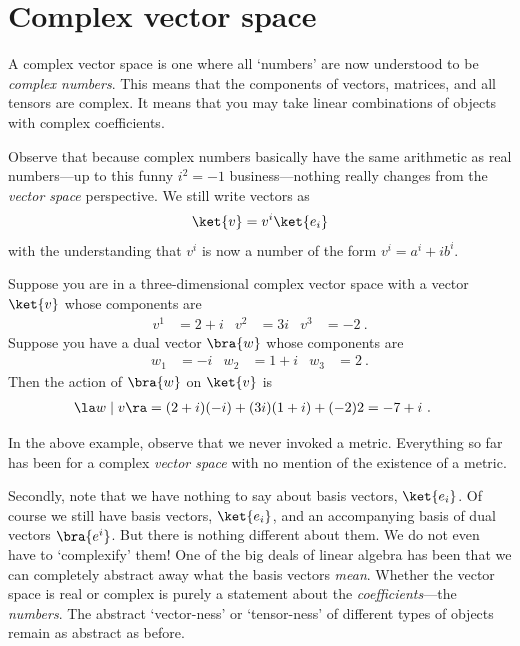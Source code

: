 \section{Complex vector space}

A complex vector space is one where all `numbers' are now understood to be \emph{complex numbers}. This means that the components of vectors, matrices, and all tensors are complex. It means that you may take linear combinations of objects with complex coefficients. 

Observe that because complex numbers basically have the same arithmetic as real numbers---up to this funny $i^2=-1$ business---nothing really changes from the \emph{vector space} perspective. We still write vectors as
\begin{align}
    \ket{v} = v^i\ket{e_i}
\end{align}
with the understanding that $v^i$ is now a number of the form $v^i = a^i + i b^i$.
\begin{example}
Suppose you are in a three-dimensional  complex vector space with a vector $\ket{v}$ whose components are
\begin{align}
    v^1 &= 2+i
    &
    v^2 &= 3i
    &
    v^3 &= -2 \ .
\end{align}
Suppose you have a dual vector $\bra{w}$ whose components are
\begin{align}
    w_1 &= -i
    &
    w_2 &= 1+i
    &
    w_3 &= 2 \ .
\end{align}
Then the action of $\bra{w}$ on $\ket{v}$ is
\begin{align}
    \la w \mid v \ra &=
    (2+i)(-i)+(3i)(1+i)+(-2)2 
    =
    -7 + i
    \ . 
\end{align}
\end{example}


In the above example, observe that we never invoked a metric. Everything so far has been for a complex \emph{vector space} with no mention of the existence of a metric. 

Secondly, note that we have nothing to say about basis vectors, $\ket{e_i}$. Of course we still have basis vectors, $\ket{e_i}$, and an accompanying basis of dual vectors $\bra{e^i}$. But there is nothing different about them. We do not even have to `complexify' them! One of the big deals of linear algebra has been that we can completely abstract away what the basis vectors \emph{mean}. Whether the vector space is real or complex is purely a statement about the \emph{coefficients}---the \emph{numbers}. The abstract `vector-ness' or `tensor-ness' of different types of objects remain as abstract as before.



